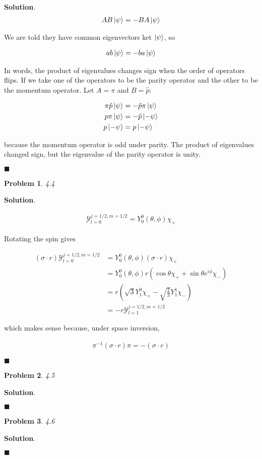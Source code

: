 \documentclass[12pt]{article}
\newtheorem{p}{Problem}
\theoremstyle{definition}
\newenvironment{s}{%
        \begin{trivlist} \item \textbf{Solution}. }{%
            \hspace*{\fill} $\blacksquare$\end{trivlist}}%
\begin{document}
{\begin{s}
\begin{align*}
AB\ket{\psi} = -BA\ket{\psi}
\end{align*}

We are told they have common eigenvectors ket $\ket{\psi}$, so

\begin{align*}
ab\ket{\psi} = -ba\ket{\psi}
\end{align*}

In words, the product of eigenvalues changes sign when the order of operators flips. If we take one of the operators to be the parity operator and the other to be the momentum operator. Let $A = \pi$ and $B = \hat{p}:$

\begin{align*}
\pi\hat{p}\ket{\psi} &= -\hat{p}\pi\ket{\psi}\\
p\pi\ket{\psi} &= -\hat{p}\ket{-\psi} \\
p\ket{-\psi} &= p\ket{-\psi} 
\end{align*} 

because the momentum operator is odd under parity. The product of eigenvalues changed sign, but the eigenvalue of the parity operator is unity.


\end{s}

\begin{p}
4.4
\end{p}

\begin{s}

\begin{align*}
\mathcal{Y}_{l=0}^{j=1/2,m=1/2} = Y_{0}^{0}(\theta,\phi)\chi_{+}
\end{align*}

Rotating the spin gives

\begin{align*}
(\sigma\cdot r)\mathcal{Y}_{l=0}^{j=1/2,m=1/2} &= Y_{0}^{0}(\theta,\phi)(\sigma\cdot r)\chi_{+}\\
&= Y_{0}^{0}(\theta,\phi)r(\cos\theta\chi_{+} + \sin\theta e^{i\phi}\chi_{-})\\
&= r\left(\sqrt{3}Y_{1}^{0}\chi_{+} - \sqrt{\frac{2}{3}}Y_{1}^{1}\chi_{-}\right)\\
&= -r\mathcal{Y}_{l=1}^{j=1/2,m=1/2}
\end{align*}

which makes sense because, under space inversion, 

\begin{align*}
\pi^{-1}(\sigma\cdot r)\pi = -(\sigma\cdot r)
\end{align*}



\end{s}

\begin{p}
4.5
\end{p}

\begin{s}

\end{s}

\begin{p}
4.6
\end{p}

\begin{s}

\end{s}
\end{document}
